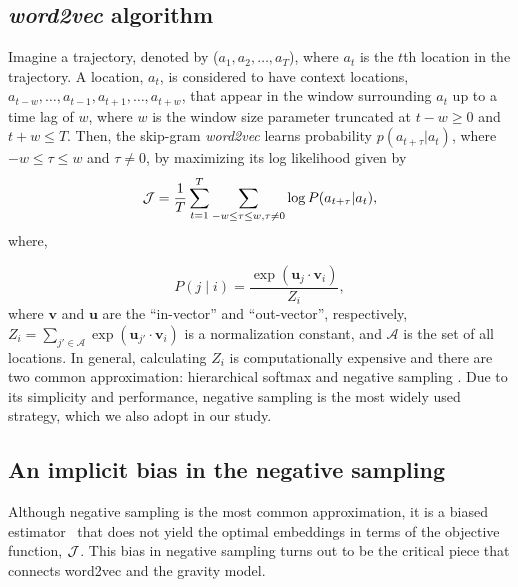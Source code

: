 \documentclass[12pt,a4paper]{article}
\newcommand{\vect}[1]{\boldsymbol{#1}}
\def\given{\mid}
\begin{document}
\subsection{\textit{word2vec} algorithm}
Imagine a trajectory, denoted by ($a_{1}, a_{2}, \ldots, a_{T}$), where $a_{t}$ is the $t$th location in the trajectory. A location, $a_{t}$, is considered to have context locations, $a_{t-w}, \ldots, a_{t-1}, a_{t+1},\ldots, a_{t+w}$, that appear in the window surrounding $a_t$ up to a time lag of $w$, where $w$ is the window size parameter truncated at $t - w \geq 0$ and $t + w \leq T$.
Then, the skip-gram \textit{word2vec} learns probability $p(a_{t + \tau} \vert a_{t})$, where $-w\leq \tau\leq w$ and $\tau \neq 0$,  by maximizing its log likelihood given by
%
%
\begin{equation}
	{\cal J} = \frac{1}{T}\sum_{t = 1}^{T} \sum_{-w \leq \tau \leq w, \tau \neq 0} \log P(a_{t + \tau} \vert a_{t}), \label{eq:word2vec-obj}
\end{equation}
where,

%
%
\begin{equation}
	P(j \given i) = \frac{\exp(\vect{u}_j \cdot \vect{v}_{i})}{Z_i}, \label{eq:cond_prob_w2v}
\end{equation}
where $\vect{v}$ and $\vect{u}$ are the ``in-vector'' and ``out-vector'', respectively,  $Z_i=\sum_{j' \in \mathcal{A}} \exp(\vect{u}_{j'} \cdot \vect{v}_{i})$ is a normalization constant, and $\mathcal{A}$ is the set of all locations. In general, calculating $Z_i$ is computationally expensive and there are two common approximation:
hierarchical softmax \autocite{morin2005hierarchical} and negative sampling \autocite{mikolov2013word2vec}.
Due to its simplicity and performance, negative sampling is the most widely used strategy, which we also adopt in our study.


\subsection{An implicit bias in the negative sampling}

Although negative sampling is the most common approximation, it is a biased estimator~\autocite{Chia2010,Dyer2014} that does not yield the optimal embeddings in terms of the objective function, ${\cal J}$.
This bias in negative sampling turns out to be the critical piece that connects word2vec and the gravity model.
\end{document}
